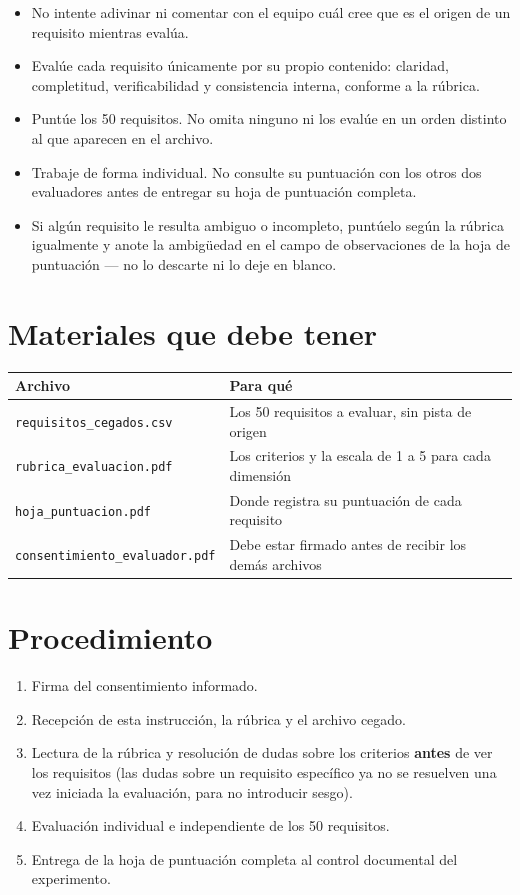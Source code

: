 \documentclass[11pt,a4paper]{article}
\begin{document}
\begin{itemize}[leftmargin=1.1cm]
  \item No intente adivinar ni comentar con el equipo cuál cree que es el
        origen de un requisito mientras evalúa.
  \item Evalúe cada requisito únicamente por su propio contenido: claridad,
        completitud, verificabilidad y consistencia interna, conforme a la
        rúbrica.
  \item Puntúe los 50 requisitos. No omita ninguno ni los evalúe en un
        orden distinto al que aparecen en el archivo.
  \item Trabaje de forma individual. No consulte su puntuación con los
        otros dos evaluadores antes de entregar su hoja de puntuación
        completa.
  \item Si algún requisito le resulta ambiguo o incompleto, puntúelo según
        la rúbrica igualmente y anote la ambigüedad en el campo de
        observaciones de la hoja de puntuación --- no lo descarte ni lo
        deje en blanco.
\end{itemize}

\section{Materiales que debe tener}

\begin{longtable}{|L{5.5cm}|L{9.0cm}|}
\hline
{}\textbf{Archivo} & \textbf{Para qué} \\ \hline
\endhead
\texttt{requisitos\_cegados.csv} & Los 50 requisitos a evaluar, sin pista de origen \\ \hline
\texttt{rubrica\_evaluacion.pdf} & Los criterios y la escala de 1 a 5 para cada dimensión \\ \hline
\texttt{hoja\_puntuacion.pdf} & Donde registra su puntuación de cada requisito \\ \hline
\texttt{consentimiento\_evaluador.pdf} & Debe estar firmado antes de recibir los demás archivos \\ \hline
\end{longtable}

\section{Procedimiento}

\begin{enumerate}[label=\arabic*.]
  \item Firma del consentimiento informado.
  \item Recepción de esta instrucción, la rúbrica y el archivo cegado.
  \item Lectura de la rúbrica y resolución de dudas sobre los criterios
        \textbf{antes} de ver los requisitos (las dudas sobre un requisito
        específico ya no se resuelven una vez iniciada la evaluación, para
        no introducir sesgo).
  \item Evaluación individual e independiente de los 50 requisitos.
  \item Entrega de la hoja de puntuación completa al control documental
        del experimento.
\end{enumerate}
\end{document}
